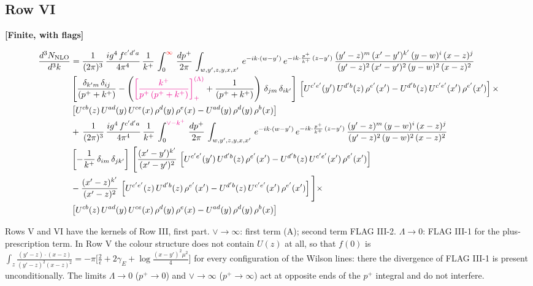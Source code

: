 \documentclass[9pt]{article}
\numberwithin{equation}{section}
\begin{document}
\subsection{Row VI}
\par\smallskip\noindent\textbf{[Finite, with flags]}\par\nobreak
\begin{align}
    \frac{d^{3}N_{\rm NLO}}{d^{3}k} & =  \frac{1}{(2\pi)^{3}}\, \frac{ig^{4}\,f^{c'd'a}}{4\pi^{4}}\, \frac{1}{k^{+}}\,\int_{0}^{{\color{red}\infty}}\, \frac{dp^{+}}{2\pi}\, \int_{w,y',z,y,x,x'}\, e^{-ik\cdot (w-y')}\, e^{-ik\cdot \frac{p^{+}}{k^{+}}\,(z-y')}\,\frac{(y'-z)^{m}\,(x'-y')^{k'}\,(y-w)^{i}\,(x-z)^{j}}{(y'-z)^{2}\,(x'-y')^{2}\,(y-w)^{2}\,(x-z)^{2}}\notag \\ & \left[\frac{\delta_{k'm}\,\delta_{ij}}{(p^{+}+k^{+})}-\left({\color{magenta}\left[\frac{k^{+}}{p^{+}\,(p^{+}+k^{+})}\right]_{+}^{(\Lambda)}}+\frac{1}{(p^{+}+k^{+})}\right)\,\delta_{jm}\,\delta_{ik'}\right]\, \left[U^{c'e'}(y')\,U^{d'b}(z)\,\rho^{e'}(x')-U^{d'b}(z)\,U^{c'e'}(x')\,\rho^{e'}(x')\right]\times\notag \\ &  \left[U^{cb}(z)\,U^{ad}(y)\,U^{ce}(x)\,\rho^{d}(y)\,\rho^{e}(x)-U^{ad}(y)\,\rho^{d}(y)\,\rho^{b}(x)\right] \notag \\ &  +\,\frac{1}{(2\pi)^{3}}\, \frac{ig^{4}\,f^{c'd'a}}{4\pi^{4}}\, \frac{1}{k^{+}}\,\int_{0}^{{\color{magenta}\vee-k^{+}}}\, \frac{dp^{+}}{2\pi}\, \int_{w,y',z,y,x,x'}\, e^{-ik\cdot (w-y')}\, e^{-ik\cdot \frac{p^{+}}{k^{+}}\,(z-y')}\,\frac{(y'-z)^{m}\,(y-w)^{i}\,(x-z)^{j}}{(y'-z)^{2}\,(y-w)^{2}\,(x-z)^{2}}\notag \\ &  \left[-\frac{1}{k^{+}}\, \delta_{im}\, \delta_{jk'}\right]\, \Bigg[\frac{(x'-y')^{k'}}{(x'-y')^{2}}\,\left[U^{c'e'}(y')\,U^{d'b}(z)\,\rho^{e'}(x')-U^{d'b}(z)\,U^{c'e'}(x')\,\rho^{e'}(x')\right]\notag \\ & -\frac{(x'-z)^{k'}}{(x'-z)^{2}}\,\left[U^{c'e'}(z)\,U^{d'b}(z)\,\rho^{e'}(x')-U^{d'b}(z)\,U^{c'e'}(x')\,\rho^{e'}(x')\right]\Bigg]\times\notag \\ &    \left[U^{cb}(z)\,U^{ad}(y)\,U^{ce}(x)\,\rho^{d}(y)\,\rho^{e}(x)-U^{ad}(y)\,\rho^{d}(y)\,\rho^{b}(x)\right]
\end{align}
\par{}\par\medskip
\noindent Rows V and VI have the kernels of Row III, first part. $\vee\to\infty$: first term (A); second term FLAG III-2. $\Lambda\to0$: FLAG III-1 for the plus-prescription term. In Row V the colour structure does not contain $U(z)$ at all, so that $f(0)$ is $\int_{z}\frac{(y'-z)\cdot(x-z)}{(y'-z)^{2}(x-z)^{2}}=-\pi\big[\frac{2}{\epsilon}+2\gamma_{E}+\log\frac{(x-y')^{2}\mu^{2}}{4}\big]$ for every configuration of the Wilson lines: there the divergence of FLAG III-1 is present unconditionally. The limits $\Lambda\to0$ ($p^{+}\to0$) and $\vee\to\infty$ ($p^{+}\to\infty$) act at opposite ends of the $p^{+}$ integral and do not interfere.
\end{document}
